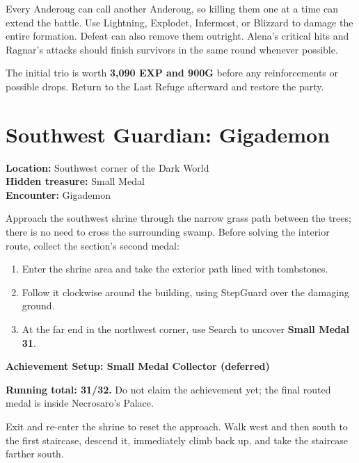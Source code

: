 \documentclass[
  american,
  10pt,
  letterpaper,
  oneside,
  open=any]{scrreprt}
\providecommand{\tightlist}{%
  \setlength{\itemsep}{0pt}\setlength{\parskip}{0pt}}
\begin{document}
Every Anderoug can call another Anderoug, so killing them one at a time
can extend the battle. Use Lightning, Explodet, Infermost, or Blizzard
to damage the entire formation. Defeat can also remove them outright.
Alena's critical hits and Ragnar's attacks should finish survivors in
the same round whenever possible.

The initial trio is worth \textbf{3,090 EXP and 900G} before any
reinforcements or possible drops. Return to the Last Refuge afterward
and restore the party.

\section{Southwest Guardian:
Gigademon}\label{southwest-guardian-gigademon}

\textbf{Location:} Southwest corner of the Dark World\\
\textbf{Hidden treasure:} Small Medal\\
\textbf{Encounter:} Gigademon

Approach the southwest shrine through the narrow grass path between the
trees; there is no need to cross the surrounding swamp. Before solving
the interior route, collect the section's second medal:

\begin{enumerate}
\def\labelenumi{\arabic{enumi}.}
\tightlist
\item
  Enter the shrine area and take the exterior path lined with
  tombstones.
\item
  Follow it clockwise around the building, using StepGuard over the
  damaging ground.
\item
  At the far end in the northwest corner, use Search to uncover
  \textbf{Small Medal 31}.
\end{enumerate}

\begin{achievementsetup}

\textbf{Achievement Setup: Small Medal Collector (deferred)}

\textbf{Running total: 31/32.} Do not claim the achievement yet; the
final routed medal is inside Necrosaro's Palace.

\end{achievementsetup}

Exit and re-enter the shrine to reset the approach. Walk west and then
south to the first staircase, descend it, immediately climb back up, and
take the staircase farther south.
\end{document}

